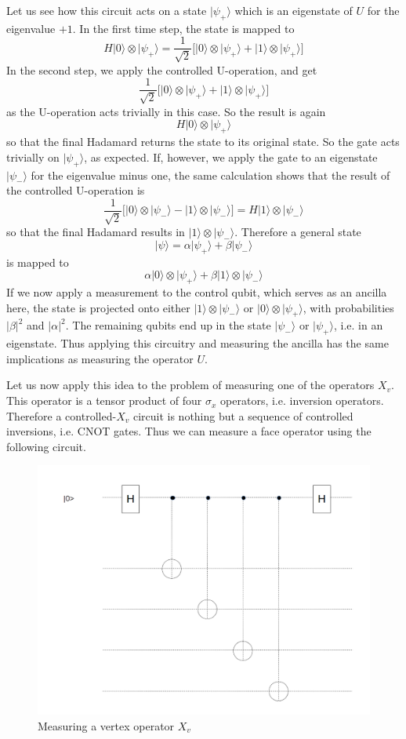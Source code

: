 \documentclass[a4paper, draft]{article}
\theoremstyle{own}
\theoremstyle{remark}
\begin{document}
Let us see how this circuit acts on a state $|\psi_+ \rangle$ which is an eigenstate of $U$ for the eigenvalue $+1$. In the first time step, the state is mapped to
$$
H|0 \rangle \otimes | \psi_+ \rangle = \frac{1}{\sqrt{2}} \big[ |0 \rangle \otimes | \psi_+ \rangle + | 1 \rangle \otimes | \psi_+ \rangle \big]
$$
In the second step, we apply the controlled U-operation, and get
$$
\frac{1}{\sqrt{2}} \big[ |0 \rangle \otimes | \psi_+ \rangle + | 1 \rangle \otimes | \psi_+ \rangle \big]
$$
as the U-operation acts trivially in this case. So the result is again
$$
H|0 \rangle \otimes | \psi_+ \rangle
$$
so that the final Hadamard returns the state to its original state. So the gate acts trivially on $|\psi_+ \rangle$, as expected. If, however, we apply the gate to an eigenstate $|\psi_- \rangle$ for the eigenvalue minus one, the same calculation shows that the result of the controlled U-operation is
$$
\frac{1}{\sqrt{2}} \big[ |0 \rangle \otimes | \psi_- \rangle - | 1 \rangle \otimes | \psi_- \rangle \big] = H|1 \rangle \otimes |\psi_- \rangle
$$
so that the final Hadamard results in $|1 \rangle \otimes |\psi_- \rangle$. Therefore a general state
$$
|\psi \rangle = \alpha |\psi_+ \rangle + \beta |\psi_- \rangle
$$
is mapped to
$$
\alpha |0 \rangle \otimes |\psi_+\rangle + \beta |1 \rangle \otimes |\psi_- \rangle
$$
If we now apply a measurement to the control qubit, which serves as an ancilla here, the state is projected onto either $|1 \rangle \otimes |\psi_- \rangle$ or $|0 \rangle \otimes |\psi_+ \rangle$, with probabilities $|\beta|^2$ and $|\alpha|^2$. The remaining qubits end up in the state $|\psi_-\rangle$ or $|\psi_+ \rangle$, i.e. in an eigenstate. Thus applying this circuitry and measuring the ancilla has the same implications as measuring the operator $U$.

Let us now apply this idea to the problem of measuring one of the operators $X_v$. This operator is a tensor product of four $\sigma_x$ operators, i.e. inversion operators. Therefore a controlled-$X_v$ circuit is nothing but a sequence of controlled inversions, i.e. CNOT gates. Thus we can measure a face operator using the following circuit.

\begin{figure}
\centering
\includegraphics[width=0.7\linewidth]{images/MeasuringXfI}
\caption{Measuring a vertex operator $X_v$}
\label{fig:MeasuringXfI}
\end{figure}
\end{document}
